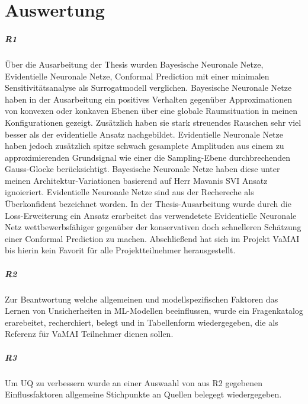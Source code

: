
\chapter{Auswertung}\label{chapter:auswertung}



\paragraph{R1} Über die Ausarbeitung der Thesis wurden Bayesische Neuronale Netze, Evidentielle Neuronale Netze, Conformal Prediction mit einer minimalen Sensitivitätsanalyse als Surrogatmodell verglichen. Bayesische Neuronale Netze haben in der Ausarbeitung ein positives Verhalten gegenüber Approximationen von konvexen oder konkaven Ebenen über eine globale Raumsituation in meinen Konfigurationen gezeigt. Zusätzlich haben sie stark streuendes Rauschen sehr viel besser als der evidentielle Ansatz nachgebildet. Evidentielle Neuronale Netze haben jedoch zusätzlich spitze schwach gesamplete Amplituden aus einem zu approximierenden Grundsignal wie einer die Sampling-Ebene durchbrechenden Gauss-Glocke berücksichtigt. Bayesische Neuronale Netze haben diese unter meinen Architektur-Variationen basierend auf Herr Mavanis SVI Ansatz ignoieriert. Evidentielle Neuronale Netze sind aus der Rechereche als Überkonfident bezeichnet worden. In der Thesis-Ausarbeitung wurde durch die Loss-Erweiterung ein Ansatz erarbeitet das verwendetete Evidentielle Neuronale Netz wettbewerbsfähiger gegenüber der konservativen doch schnelleren Schätzung einer Conformal Prediction zu machen. Abschließend hat sich im Projekt VaMAI bis hierin kein Favorit für alle Projektteilnehmer herausgestellt.


\paragraph{R2} Zur Beantwortung welche allgemeinen und modellspezifischen Faktoren das Lernen von Unsicherheiten in ML-Modellen beeinflussen, wurde ein Fragenkatalog erarebeitet, recherchiert, belegt und in Tabellenform wiedergegeben, die als Referenz für VaMAI Teilnehmer dienen sollen. 


\paragraph{R3} Um UQ zu verbessern wurde an einer Auswaahl von aus R2 gegebenen Einflussfaktoren allgemeine Stichpunkte an Quellen belegegt wiedergegeben. 


